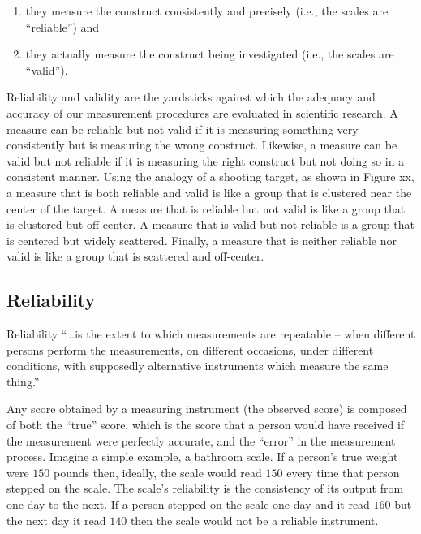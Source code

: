 \begin{enumerate}
	\item they measure the construct consistently and precisely (i.e., the scales are ``reliable'') and 

	\item they actually measure the construct being investigated (i.e., the scales are ``valid''). 
\end{enumerate}

Reliability and validity are the yardsticks against which the adequacy and accuracy of our measurement procedures are evaluated in scientific research.
A measure can be reliable but not valid if it is measuring something very consistently but is measuring the wrong construct. Likewise, a measure can be valid but not reliable if it is measuring the right construct but not doing so in a consistent manner. Using the analogy of a shooting target, as shown in Figure xx, a measure that is both reliable and valid is like a group that is clustered near the center of the target. A measure that is reliable but not valid is like a group that is clustered but off-center. A measure that is valid but not reliable is a group that is centered but widely scattered. Finally, a measure that is neither reliable nor valid is like a group that is scattered and off-center. 

\subsection{Reliability}

Reliability ``...is the extent to which measurements are repeatable – when different persons perform the measurements, on different occasions, under different conditions, with supposedly alternative instruments which measure the same thing.''\cite{drost2011validity}

Any score obtained by a measuring instrument (the observed score) is composed of both the ``true'' score, which is the score that a person would have received if the measurement were perfectly accurate, and the ``error'' in the measurement process. Imagine a simple example, a bathroom scale. If a person's true weight were $ 150 $ pounds then, ideally, the scale would read $ 150 $ every time that person stepped on the scale. The scale's reliability is the consistency of its output from one day to the next. If a person stepped on the scale one day and it read $ 160 $ but the next day it read $ 140 $ then the scale would not be a reliable instrument.

